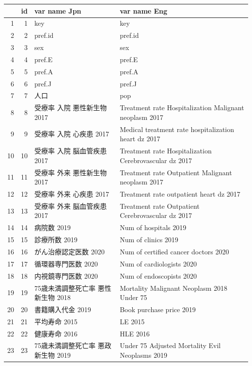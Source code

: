 \begin{table}[ht]
\centering
\begin{tabular}{rrll}
  \hline
 & id & var name Jpn & var name Eng \\ 
  \hline
1 &   1 & key & key \\ 
  2 &   2 & pref.id & pref.id \\ 
  3 &   3 & sex & sex \\ 
  4 &   4 & pref.E & pref.E \\ 
  5 &   5 & pref.A & pref.A \\ 
  6 &   6 & pref.J & pref.J \\ 
  7 &   7 & 人口 & pop \\ 
  8 &   8 & 受療率 入院 悪性新生物 2017 & Treatment rate Hospitalization Malignant neoplasm 2017 \\ 
  9 &   9 & 受療率 入院 心疾患 2017 & Medical treatment rate hospitalization heart dz 2017 \\ 
  10 &  10 & 受療率 入院 脳血管疾患 2017 & Treatment rate Hospitalization Cerebrovascular dz 2017 \\ 
  11 &  11 & 受療率 外来 悪性新生物 2017 & Treatment rate Outpatient Malignant neoplasm 2017 \\ 
  12 &  12 & 受療率 外来 心疾患 2017 & Treatment rate outpatient heart dz 2017 \\ 
  13 &  13 & 受療率 外来 脳血管疾患 2017 & Treatment rate Outpatient Cerebrovascular dz 2017 \\ 
  14 &  14 & 病院数 2019 & Num of hospitals 2019 \\ 
  15 &  15 & 診療所数 2019 & Num of clinics 2019 \\ 
  16 &  16 & がん治療認定医数 2020 & Num of certified cancer doctors 2020 \\ 
  17 &  17 & 循環器専門医数 2020 & Num of cardiologists 2020 \\ 
  18 &  18 & 内視鏡専門医数 2020 & Num of endoscopists 2020 \\ 
  19 &  19 & 75歳未満調整死亡率 悪性新生物 2018 & Mortality Malignant Neoplasm 2018 Under 75 \\ 
  20 &  20 & 書籍購入代金 2019 & Book purchase price 2019 \\ 
  21 &  21 & 平均寿命 2015 & LE 2015 \\ 
  22 &  22 & 健康寿命 2016 & HLE 2016 \\ 
  23 &  23 & 75歳未満調整死亡率 悪政新生物 2019 & Under 75 Adjusted Mortality Evil Neoplasms 2019 \\ 

\end{tabular}
\end{table}
